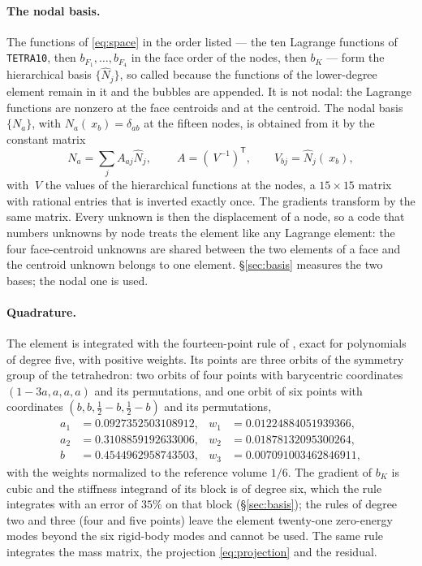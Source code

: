 \documentclass[11pt]{article}
\newcommand{\bx}{~x}
\newcommand{\transpose}[1]{#1^{\mathsf{T}}}
\newcommand{\code}[1]{\texttt{#1}}
\theoremstyle{definition}
\theoremstyle{plain}
\begin{document}
\paragraph{The nodal basis.} The functions of \eqref{eq:space} in the order
listed --- the ten Lagrange functions of \code{TETRA10}, then $b_{F_1},
\dots, b_{F_4}$ in the face order of the nodes, then $b_K$ --- form the
hierarchical basis $\{\hat N_j\}$, so called because the functions of the
lower-degree element remain in it and the bubbles are appended. It is not
nodal: the Lagrange functions are nonzero at the face centroids and at the
centroid. The nodal basis $\{N_a\}$, with $N_a(\bx_b) = \delta_{ab}$ at the
fifteen nodes, is obtained from it by the constant matrix
\begin{equation}
  \label{eq:nodaltransform}
  N_a = \sum_j A_{aj} \hat N_j, \qquad ~A = \transpose{(~V^{-1})},
  \qquad V_{bj} = \hat N_j(\bx_b) ,
\end{equation}
with $~V$ the values of the hierarchical functions at the nodes, a $15
\times 15$ matrix with rational entries that is inverted exactly once. The
gradients transform by the same matrix. Every unknown is then the
displacement of a node, so a code that numbers unknowns by node treats the
element like any Lagrange element: the four face-centroid unknowns are
shared between the two elements of a face and the centroid unknown belongs
to one element. \S\ref{sec:basis} measures the two bases; the nodal one is
used.

\paragraph{Quadrature.} The element is integrated with the fourteen-point
rule of \citet{Keast:1986}, exact for polynomials of degree five, with
positive weights. Its points are three orbits of the symmetry group of the
tetrahedron: two orbits of four points with barycentric coordinates
$(1 - 3a, a, a, a)$ and its permutations, and one orbit of six points with
coordinates $(b, b, \tfrac12 - b, \tfrac12 - b)$ and its permutations,
\begin{equation}
  \label{eq:keast}
  \begin{aligned}
    a_1 &= 0.0927352503108912, & w_1 &= 0.01224884051939366, \\
    a_2 &= 0.3108859192633006, & w_2 &= 0.01878132095300264, \\
    b   &= 0.4544962958743503, & w_3 &= 0.007091003462846911,
  \end{aligned}
\end{equation}
with the weights normalized to the reference volume $1/6$. The gradient of
$b_K$ is cubic and the stiffness integrand of its block is of degree six,
which the rule integrates with an error of $35\%$ on that block
(\S\ref{sec:basis}); the rules of degree two and three (four and five
points) leave the element twenty-one zero-energy modes beyond the six
rigid-body modes and cannot be used. The same rule integrates the mass
matrix, the projection \eqref{eq:projection} and the residual.
\end{document}

